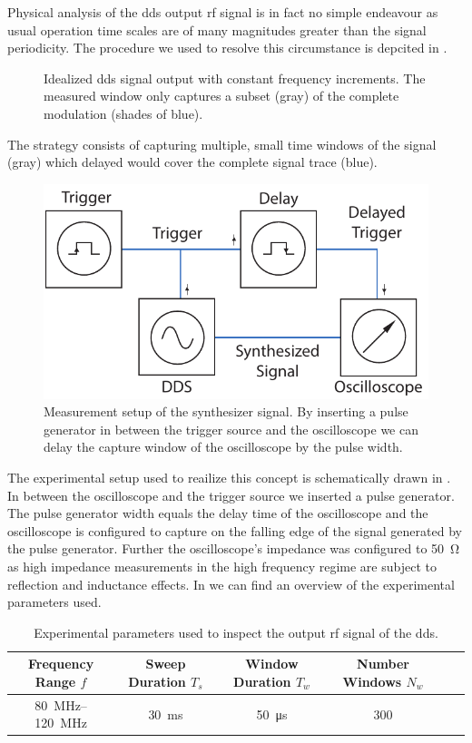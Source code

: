 Physical analysis of the \gls{dds} output \gls{rf} signal is in fact no simple
endeavour as usual operation time scales are of many magnitudes greater than
the signal periodicity. The procedure we used to resolve this circumstance is
depcited in .
\begin{figure}[htb]
  \centering
  \begin{adjustbox}{width=\textwidth}
    
  \end{adjustbox}
  \caption{Idealized \gls{dds} signal output with constant frequency
    increments. The measured window only captures a subset (gray) of the complete
    modulation (shades of blue).}\label{fig:signal_window}
\end{figure}
The strategy consists of capturing multiple, small time windows of the signal
(gray) which delayed would cover the complete signal trace (blue).
\begin{figure}[htb]
  \centering
  \includegraphics[width=.6\textwidth]{../figure/signal/setup-dds.pdf}
  \caption{Measurement setup of the synthesizer signal. By inserting a pulse
    generator in between the trigger source and the oscilloscope we can delay
    the capture window of the oscilloscope by the pulse width.
  }\label{fig:signal_window_setup}
\end{figure}
The experimental setup used to reailize this concept is schematically drawn in
. In between the oscilloscope and the trigger
source we inserted a pulse generator. The pulse generator width equals the
delay time of the oscilloscope and the oscilloscope is configured to capture
on the falling edge of the signal generated by the pulse generator. Further
the oscilloscope's impedance was configured to \SI{50}{\ohm} as high impedance
measurements in the high frequency regime are subject to reflection and
inductance effects. In  we can find an
overview of the experimental parameters used.
\begin{table}[htb]
  \centering
  \begin{tabular}{cccccc}
    \toprule
    Frequency Range $f$ &
    Sweep Duration $T_s$ &
    Window Duration $T_w$ &
    Number Windows $N_w$ \\
    \midrule
    \SIrange{80}{120}{\mega\hertz} &
    \SI{30}{\milli\second} &
    \SI{50}{\micro\second} &
    300 \\
    \bottomrule
  \end{tabular}
  \caption{Experimental parameters used to inspect the output \gls{rf} signal
    of the \gls{dds}.
  }\label{tab:signal_parameters_dds}
\end{table}
